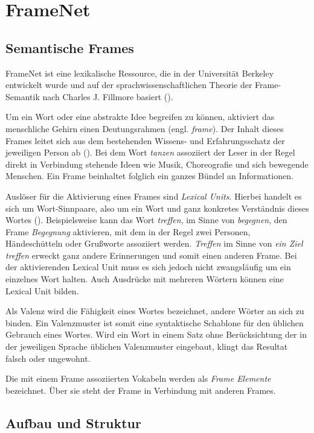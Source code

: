 \section{FrameNet}

\subsection{Semantische Frames}

FrameNet ist eine lexikalische Ressource, die in der Universität Berkeley entwickelt wurde und  auf der sprachwissenschaftlichen Theorie der Frame-Semantik nach Charles J. Fillmore basiert (\cite[vgl.][1]{NLTKPROJEKT}).
\par
Um ein Wort oder eine abstrakte Idee begreifen zu können, aktiviert das menschliche Gehirn einen Deutungsrahmen (engl. \textit{frame}). Der Inhalt dieses Frames leitet sich aus dem bestehenden Wissens- und Erfahrungsschatz der jeweiligen Person ab (\cite[vgl.][28]{WEHLING}). Bei dem Wort \textit{tanzen} assoziiert der Leser in der Regel direkt in Verbindung stehende Ideen wie Musik, Choreografie und sich bewegende Menschen. Ein Frame beinhaltet folglich ein ganzes Bündel an Informationen.
\par
Auslöser für die Aktivierung eines Frames sind \textit{Lexical Units}. Hierbei handelt es sich um Wort-Sinnpaare, also um ein Wort und ganz konkretes Verständnis dieses Wortes (\cite[vgl.][1]{NLTKPROJEKT}). Beispielsweise kann das Wort \textit{treffen}, im Sinne von \textit{begegnen}, den Frame \textit{Begegnung} aktivieren, mit dem in der Regel zwei Personen, Händeschütteln oder Grußworte assoziiert werden. \textit{Treffen} im Sinne von \textit{ein Ziel treffen} erweckt ganz andere Erinnerungen und somit einen anderen Frame. Bei der aktivierenden Lexical Unit muss es sich jedoch nicht zwangsläufig um ein einzelnes Wort halten. Auch Ausdrücke mit mehreren Wörtern können eine Lexical Unit bilden.
\par
Als Valenz wird die Fähigkeit eines Wortes bezeichnet, andere Wörter an sich zu binden. Ein Valenzmuster ist somit eine syntaktische Schablone für den üblichen Gebrauch eines Wortes. Wird ein Wort in einem Satz ohne Berücksichtung der in der jeweiligen Sprache üblichen Valenzmuster eingebaut, klingt das Resultat falsch oder ungewohnt.
\par
Die mit einem Frame assoziierten Vokabeln werden als \textit{Frame Elemente} bezeichnet. Über sie steht der Frame in Verbindung mit anderen Frames. 

\subsection{Aufbau und Struktur}

